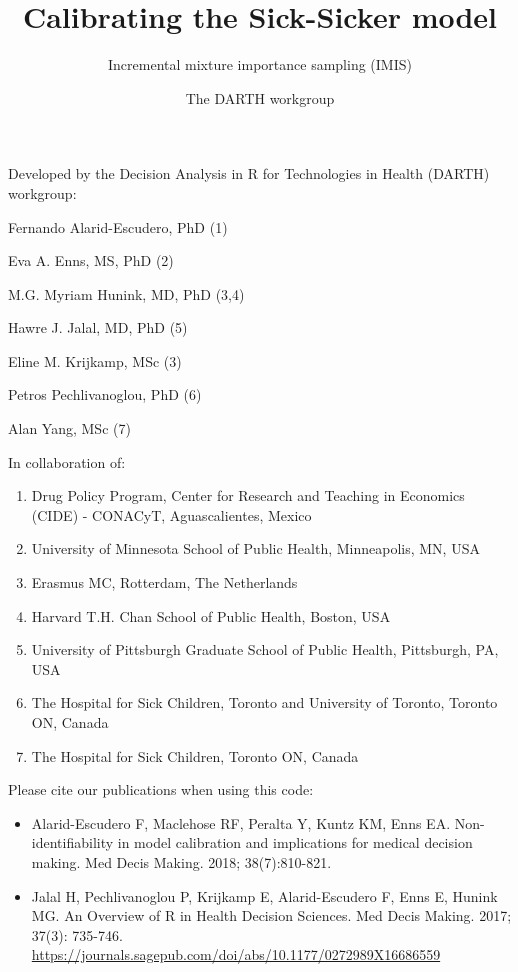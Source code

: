 \documentclass[
]{article}
\title{Calibrating the Sick-Sicker model}
\subtitle{Incremental mixture importance sampling (IMIS)}
\author{The DARTH workgroup}
\date{}
\providecommand{\tightlist}{%
  \setlength{\itemsep}{0pt}\setlength{\parskip}{0pt}}
\begin{document}
\maketitle

Developed by the Decision Analysis in R for Technologies in Health
(DARTH) workgroup:

Fernando Alarid-Escudero, PhD (1)

Eva A. Enns, MS, PhD (2)

M.G. Myriam Hunink, MD, PhD (3,4)

Hawre J. Jalal, MD, PhD (5)

Eline M. Krijkamp, MSc (3)

Petros Pechlivanoglou, PhD (6)

Alan Yang, MSc (7)

In collaboration of:

\begin{enumerate}
\def\labelenumi{\arabic{enumi}.}
\tightlist
\item
  Drug Policy Program, Center for Research and Teaching in Economics
  (CIDE) - CONACyT, Aguascalientes, Mexico
\item
  University of Minnesota School of Public Health, Minneapolis, MN, USA
\item
  Erasmus MC, Rotterdam, The Netherlands
\item
  Harvard T.H. Chan School of Public Health, Boston, USA
\item
  University of Pittsburgh Graduate School of Public Health, Pittsburgh,
  PA, USA
\item
  The Hospital for Sick Children, Toronto and University of Toronto,
  Toronto ON, Canada
\item
  The Hospital for Sick Children, Toronto ON, Canada
\end{enumerate}

Please cite our publications when using this code:

\begin{itemize}
\item
  Alarid-Escudero F, Maclehose RF, Peralta Y, Kuntz KM, Enns EA.
  Non-identifiability in model calibration and implications for medical
  decision making. Med Decis Making. 2018; 38(7):810-821.
\item
  Jalal H, Pechlivanoglou P, Krijkamp E, Alarid-Escudero F, Enns E,
  Hunink MG. An Overview of R in Health Decision Sciences. Med Decis
  Making. 2017; 37(3): 735-746.
  \url{https://journals.sagepub.com/doi/abs/10.1177/0272989X16686559}
\end{itemize}
\end{document}
